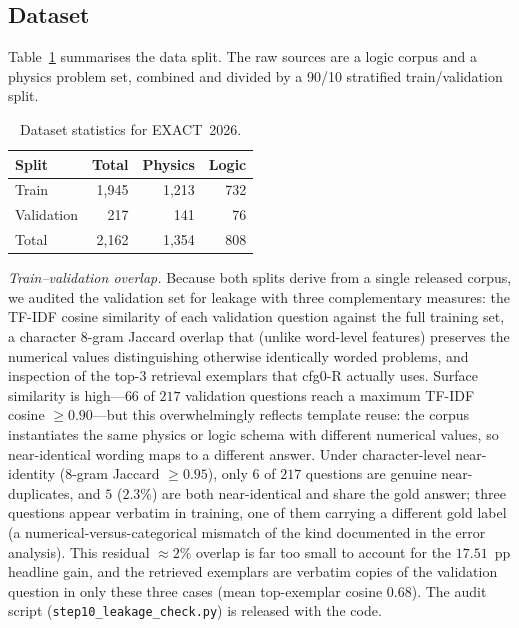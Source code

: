 \documentclass[APA,twocolumn]{USG}
\newcommand{\dataset}{EXACT~2026}
\begin{document}
\subsection{Dataset}
Table~\ref{tab1} summarises the data split. The raw sources are a logic corpus
and a physics problem set, combined and divided by a 90/10 stratified
train/validation split.

\begin{table}[t]
\centering
\caption{Dataset statistics for \dataset{}.\label{tab1}}
\begin{tabular*}{\columnwidth}{@{\extracolsep\fill}lrrr@{\extracolsep\fill}}
\toprule
\textbf{Split} & \textbf{Total} & \textbf{Physics} & \textbf{Logic} \\
\midrule
Train & 1{,}945 & 1{,}213 & 732 \\
Validation & 217 & 141 & 76 \\
\midrule
Total & 2{,}162 & 1{,}354 & 808 \\
\bottomrule
\end{tabular*}
\end{table}

\textit{Train--validation overlap.} Because both splits derive from a single
released corpus, we audited the validation set for leakage with three
complementary measures: the TF-IDF cosine similarity of each validation question
against the full training set, a character $8$-gram Jaccard overlap that (unlike
word-level features) preserves the numerical values distinguishing otherwise
identically worded problems, and inspection of the top-$3$ retrieval exemplars
that cfg0-R actually uses. Surface similarity is high---$66$ of $217$ validation
questions reach a maximum TF-IDF cosine $\geq 0.90$---but this overwhelmingly
reflects template reuse: the corpus instantiates the same physics or logic
schema with different numerical values, so near-identical wording maps to a
different answer. Under character-level near-identity ($8$-gram
Jaccard $\geq 0.95$), only $6$ of $217$ questions are genuine near-duplicates,
and $5$ ($2.3\%$) are both near-identical and share the gold answer; three
questions appear verbatim in training, one of them carrying a different gold
label (a numerical-versus-categorical mismatch of the kind documented in the
error analysis). This residual ${\approx}2\%$ overlap is far too small to account
for the $17.51$~pp headline gain, and the retrieved exemplars are verbatim copies
of the validation question in only these three cases (mean top-exemplar cosine
$0.68$). The audit script (\texttt{step10\_leakage\_check.py}) is released with
the code.
\end{document}
